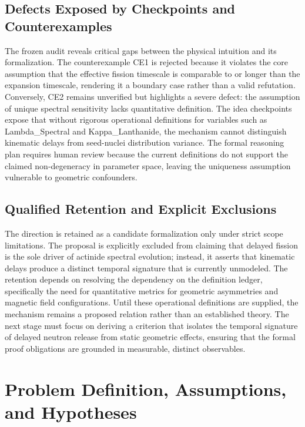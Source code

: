 \documentclass[conference]{IEEEtran}
\begin{document}
\subsection{Defects Exposed by Checkpoints and Counterexamples}
The frozen audit reveals critical gaps between the physical intuition and its formalization. The counterexample CE1 is rejected because it violates the core assumption that the effective fission timescale is comparable to or longer than the expansion timescale, rendering it a boundary case rather than a valid refutation. Conversely, CE2 remains unverified but highlights a severe defect: the assumption of unique spectral sensitivity lacks quantitative definition. The idea checkpoints expose that without rigorous operational definitions for variables such as Lambda\_Spectral and Kappa\_Lanthanide, the mechanism cannot distinguish kinematic delays from seed-nuclei distribution variance. The formal reasoning plan requires human review because the current definitions do not support the claimed non-degeneracy in parameter space, leaving the uniqueness assumption vulnerable to geometric confounders.

\subsection{Qualified Retention and Explicit Exclusions}
The direction is retained as a candidate formalization only under strict scope limitations. The proposal is explicitly excluded from claiming that delayed fission is the sole driver of actinide spectral evolution; instead, it asserts that kinematic delays produce a distinct temporal signature that is currently unmodeled. The retention depends on resolving the dependency on the definition ledger, specifically the need for quantitative metrics for geometric asymmetries and magnetic field configurations. Until these operational definitions are supplied, the mechanism remains a proposed relation rather than an established theory. The next stage must focus on deriving a criterion that isolates the temporal signature of delayed neutron release from static geometric effects, ensuring that the formal proof obligations are grounded in measurable, distinct observables.

\section{Problem Definition, Assumptions, and Hypotheses}
\end{document}

